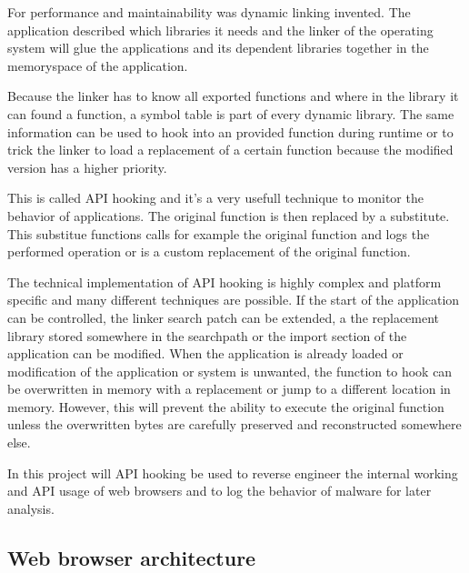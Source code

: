 For performance and maintainability was dynamic linking invented. The application described which libraries it needs and the linker of the operating system will glue the applications and its dependent libraries together in the memoryspace of the application. 

Because the linker has to know all exported functions and where in the library it can found a function, a symbol table is part of every dynamic library. The same information can be used to hook into an provided function during runtime or to trick the linker to load a replacement of a certain function because the modified version has a higher priority.

This is called API hooking\cite{} and it's a very usefull technique to monitor the behavior of applications. The original function is then replaced by a substitute. This substitue functions calls for example the original function and logs the performed operation or is a custom replacement of the original function.

The technical implementation of API hooking is highly complex and platform specific and many different techniques\cite{http://jbremer.org/x86-api-hooking-demystified/} are possible. If the start of the application can be controlled, the linker search patch can be extended, a the replacement library stored somewhere in the searchpath or the import section of the application can be modified. When the application is already loaded or modification of the application or system is unwanted, the function to hook can be overwritten in memory with a replacement or jump to a different location in memory. However, this will prevent the ability to execute the original function unless the overwritten bytes are carefully preserved and reconstructed somewhere else.

In this project will API hooking be used to reverse engineer the internal working and API usage of web browsers and to log the behavior of malware for later analysis.

\subsection{Web browser architecture}

